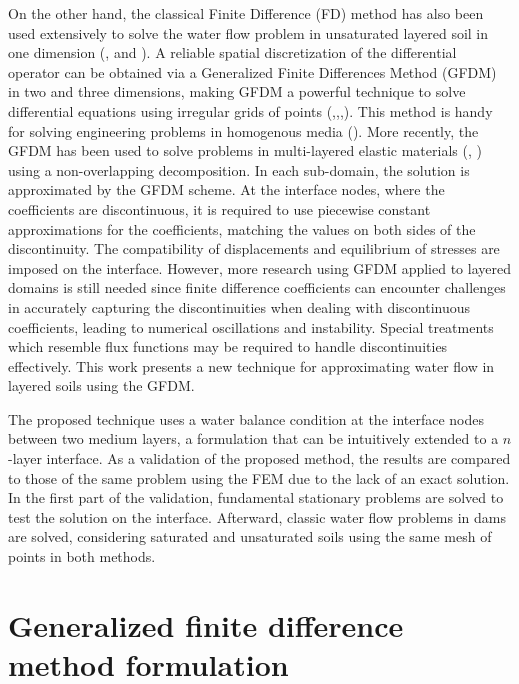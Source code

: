 \documentclass[a4paper,fleqn]{cas-sc}
\begin{document}
On the other hand, the classical Finite Difference (FD) method has also been used extensively to solve the water flow problem in unsaturated layered soil in one dimension (\cite{romano1998numerical},\cite{szymkiewicz2011comparison} and \cite{zhu2020improved}).{ A reliable spatial discretization of the differential operator can be obtained via a Generalized Finite Differences Method (GFDM) in two and three dimensions, making GFDM a powerful technique to solve differential equations using irregular grids of points (\cite{tiwari2003finite},\cite{benito2003h},\cite{benito2001influence},\cite{benito2007solving}). This method is handy for solving engineering problems in homogenous media (\cite{Urena2011appli,chavez2018numerical,tinoco2018stability,li2019generalized,tinoco2020study,zhang2020solving,chavez2021,roman2022numerical}). More recently, the GFDM has been used to solve problems in multi-layered elastic materials (\cite{wang2018domain}, \cite{wang2020domain}) using a non-overlapping decomposition. In each sub-domain, the solution is approximated by the GFDM scheme. At the interface nodes, where the coefficients are discontinuous, it is required to use piecewise constant approximations for the coefficients, matching the values on both sides of the discontinuity. The compatibility of displacements and equilibrium of stresses are imposed on the interface. However, more research using GFDM applied to layered domains is still needed since finite difference coefficients can encounter challenges in accurately capturing the discontinuities when dealing with discontinuous coefficients, leading to numerical oscillations and instability. Special treatments which resemble flux functions may be required to handle discontinuities effectively. This work presents a new technique for approximating water flow in layered soils using the GFDM.}

The proposed technique uses a water balance condition at the interface nodes between two medium layers, a formulation that can be intuitively extended to a $n$-layer interface. As a validation of the proposed method, the results are compared to those of the same problem using the FEM due to the lack of an exact solution. In the first part of the validation, fundamental stationary problems are solved to test the solution on the interface. Afterward, classic water flow problems in dams are solved, considering saturated and unsaturated soils using the same mesh of points in both methods.

\section{Generalized finite difference method formulation}\label{gfdm}
\end{document}
